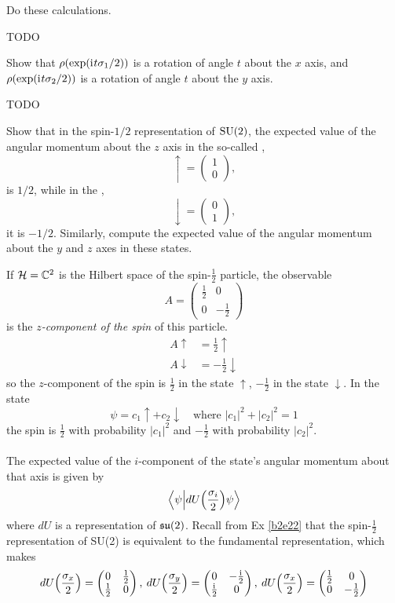 \documentclass[10pt]{article}
\begin{document}
\begin{example}
	Do these calculations.
\end{example}
\sol TODO


\begin{example}
	Show that $\rho(\exp(\mathrm{i}\mkern1mu t\sigma_1/2))$ is a rotation of angle $t$ about the $x$ axis, and $\rho(\exp(\mathrm{i}\mkern1mu t\sigma_2/2))$ is a rotation of angle $t$ about the $y$ axis.
\end{example}
\sol TODO


\begin{example}
	Show that in the spin-$1/2$ representation of $\text{SU}(2)$, the expected value of the angular momentum about the $z$ axis in the so-called ,
	$$
	\uparrow = \begin{pmatrix}
		1\\0
	\end{pmatrix},
	$$
	is $1/2$, while in the ,
	$$
	\downarrow = \begin{pmatrix}
		0\\1
	\end{pmatrix},
	$$
	it is $-1/2$. Similarly, compute the expected value of the angular momentum about the $y$ and $z$ axes in these states.
\end{example}
\sol If $\mathcal{H} = \mathbb{C}^2$ is the Hilbert space of the spin-$\frac12$ particle, the observable
$$
A = \begin{pmatrix}
	\frac12&0\\0&-\frac12
\end{pmatrix}
$$
is the \emph{$z$-component of the spin} of this particle.
$$
\begin{aligned}
	A\uparrow&=\frac12\uparrow\\
	A\downarrow&=-\frac12\downarrow
\end{aligned}
$$
so the $z$-component of the spin is $\frac12$ in the state $\uparrow$, $-\frac12$ in the state $\downarrow$. In the state
$$
\psi = c_1\uparrow + c_2\downarrow\quad\text{where }|c_1|^2+|c_2|^2=1
$$
the spin is $\frac12$ with probability $|c_1|^2$ and $-\frac12$ with probability $|c_2|^2$.\\\\
The expected value of the $i$-component of the state's angular momentum about that axis is given by
$$
\ip{\psi}{dU\p*{\frac{\sigma_i}{2}}\psi}
$$
where $dU$ is a representation of $\mathfrak{su}(2)$. Recall from Ex \ref{b2e22} that the spin-$\frac12$ representation of SU(2) is equivalent to the fundamental representation, which makes
$$
dU\p*{\frac{\sigma_x}{2}} = \begin{pmatrix}
	0&\frac12\\\frac12&0
\end{pmatrix},\:
dU\p*{\frac{\sigma_y}{2}} = \begin{pmatrix}
	0&-\frac{\di}{2}\\\frac{\di}{2}&0
\end{pmatrix},\:
dU\p*{\frac{\sigma_x}{2}} = \begin{pmatrix}
	\frac12&0\\0&-\frac12
\end{pmatrix}
$$
\end{document}
